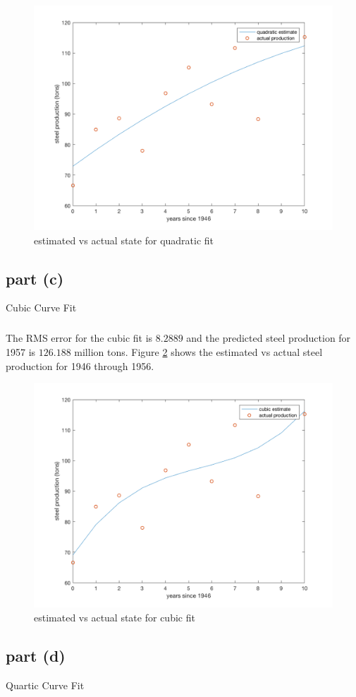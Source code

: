 \documentclass[11pt]{article}
\begin{document}
\begin{figure}[h!]
	\centering
	\includegraphics[width=0.8\linewidth]{p1_plot2.png}
	\caption{estimated vs actual state for quadratic fit}
	\label{p1_plot2}
\end{figure}

\subsection*{part (c)}
Cubic Curve Fit

\subparagraph*{}
The RMS error for the cubic fit is $8.2889$ and the predicted steel production for 1957 is $126.188$ million tons. Figure \ref{p1_plot3} shows the estimated vs actual steel production for 1946 through 1956.
\begin{figure}[h!]
	\centering
	\includegraphics[width=0.8\linewidth]{p1_plot3.png}
	\caption{estimated vs actual state for cubic fit}
	\label{p1_plot3}
\end{figure}

\subsection*{part (d)}
Quartic Curve Fit
\end{document}
